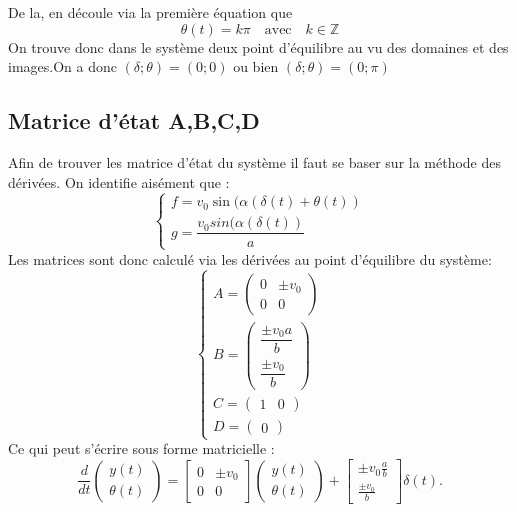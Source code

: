 \documentclass[11pt,a4paper]{article}
\begin{document}
De la, en découle via la première équation que 
$$\theta(t)=k\pi \quad \text{avec} \quad k \in \mathbb{Z}$$
On trouve donc dans le système deux point d'équilibre au vu des domaines et des images.On a donc $(\delta;\theta)=(0;0)$ ou bien $(\delta;\theta)=(0;\pi)$ 
\subsection{Matrice d'état A,B,C,D}
Afin de trouver les matrice d'état du système il faut se baser sur la méthode des dérivées.
On identifie aisément que :
\begin{equation}
    \begin{cases}
     f= v_0 \sin(\alpha(\delta(t)+\theta(t)) \\
     g= \dfrac{v_0 sin(\alpha(\delta(t))}{a} 
    \end{cases} 
\end{equation}
Les matrices sont donc calculé via les dérivées au point d'équilibre du système:
\begin{equation}
\begin{cases}
    A= \begin{pmatrix}
        0 & \pm v_0 \\
        0 & 0
    \end{pmatrix} \\
        B= \begin{pmatrix}
        \dfrac{\pm v_0 a}{b}  \\
        \dfrac{\pm v_0}{b}  
    \end{pmatrix} \\
            C= \begin{pmatrix}
            1 & 0 
    \end{pmatrix}\\
            D= \begin{pmatrix}
        0  
    \end{pmatrix}
\end{cases}
\end{equation}
Ce qui peut s'écrire sous forme matricielle : 
\[
\frac{d}{dt}
\begin{pmatrix}
    y(t) \\
    \theta(t)
\end{pmatrix}
=
\begin{bmatrix}
    0 & \pm v_0 \\
    0 & 0
\end{bmatrix}
\begin{pmatrix}
    y(t) \\
    \theta(t)
\end{pmatrix}
+
\begin{bmatrix}
    \pm v_0 \frac{a}{b} \\
    \frac{\pm v_0}{b}
\end{bmatrix}
\delta(t).
\]
\end{document}

